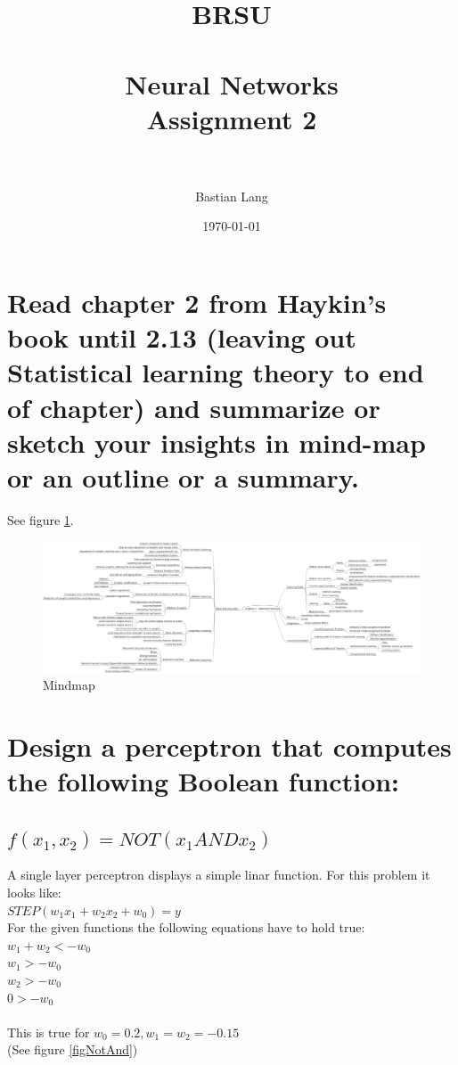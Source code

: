 \documentclass[paper=a4, fontsize=11pt]{scrartcl} %
\title{	
\normalfont \normalsize 
\textsc{BRSU} \\ [25pt] %
\horrule{0.5pt} \\[0.4cm] %
\huge Neural Networks\\Assignment 2 \\ %
\horrule{2pt} \\[0.5cm] %
}
\author{Bastian Lang} %
\date{\normalsize\today} %
\numberwithin{equation}{section} %
\numberwithin{figure}{section} %
\numberwithin{table}{section} %
\begin{document}
\maketitle %

\section{Read chapter 2 from Haykin's book until 2.13 (leaving out Statistical learning theory to
end of chapter) and summarize or sketch your insights in mind-map or an outline or a
summary.}

See figure \ref{fig1}.

\begin{figure}[ht]
	\centering
  \includegraphics[width=1\textheight, angle=90]{mindmap.jpeg}
	\caption{Mindmap}
	\label{fig1}
\end{figure}

\section{Design a perceptron that computes the following Boolean function:}

\subsection{$f(x_1 , x_2 ) = NOT(x_1 AND x_2 )$}

A single layer perceptron displays a simple linar function. For this problem it looks like:\\
$STEP(w_1x_1 + w_2x_2 + w_0) = y$\\
For the given functions the following equations have to hold true:\\
$w_1 + w_2 < -w_0$\\
$w_1 > -w_0$\\
$w_2 > -w_0$\\
$0 > -w_0$\\\\

This is true for $w_0 = 0.2, w_1 = w_2 = -0.15$\\
(See figure \ref{figNotAnd})
\end{document}
